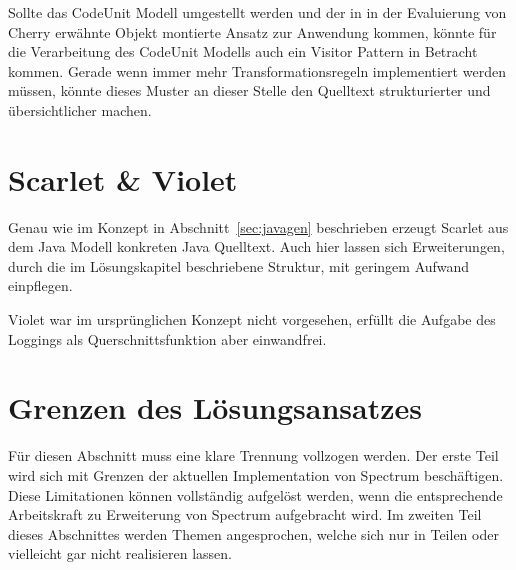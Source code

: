 \documentclass[12pt,oneside,a4paper,parskip]{scrbook}
\begin{document}
Sollte das CodeUnit Modell umgestellt werden und der in in der Evaluierung von Cherry erwähnte Objekt montierte Ansatz zur Anwendung kommen, könnte für die Verarbeitung des CodeUnit Modells auch ein Visitor Pattern in Betracht kommen. Gerade wenn immer mehr Transformationsregeln implementiert werden müssen, könnte dieses Muster an dieser Stelle den Quelltext strukturierter und übersichtlicher machen.

\section{Scarlet \& Violet}

Genau wie im Konzept in Abschnitt~\ref{sec:javagen} beschrieben erzeugt Scarlet aus dem Java Modell konkreten Java Quelltext. Auch hier lassen sich Erweiterungen, durch die im Lösungskapitel beschriebene Struktur, mit geringem Aufwand einpflegen.

Violet war im ursprünglichen Konzept nicht vorgesehen, erfüllt die Aufgabe des Loggings als Querschnittsfunktion aber einwandfrei.



\section{Grenzen des Lösungsansatzes}

Für diesen Abschnitt muss eine klare Trennung vollzogen werden. Der erste Teil wird sich mit Grenzen der aktuellen Implementation von Spectrum beschäftigen. Diese Limitationen können vollständig aufgelöst werden, wenn die entsprechende Arbeitskraft zu Erweiterung von Spectrum aufgebracht wird. Im zweiten Teil dieses Abschnittes werden Themen angesprochen, welche sich nur in Teilen oder vielleicht gar nicht realisieren lassen.
\end{document}
